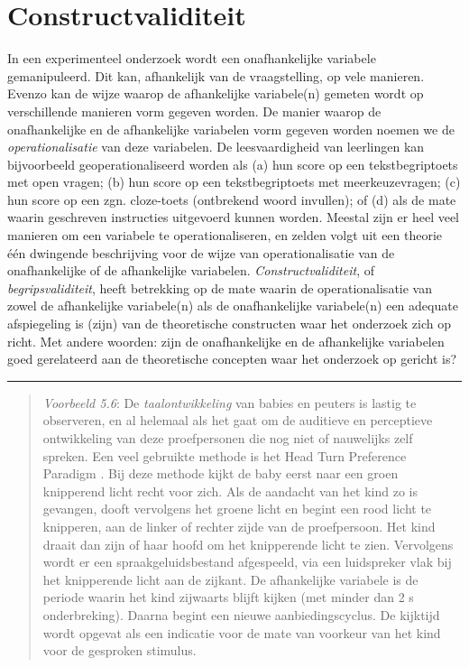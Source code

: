 \documentclass[
]{book}
\begin{document}
\section{Constructvaliditeit}\label{sec:constructvaliditeit}

In een experimenteel onderzoek wordt een onafhankelijke variabele
gemanipuleerd. Dit kan, afhankelijk van de vraagstelling, op vele
manieren. Evenzo kan de wijze waarop de afhankelijke variabele(n)
gemeten wordt op verschillende manieren vorm gegeven worden. De manier
waarop de onafhankelijke en de afhankelijke variabelen vorm gegeven
worden noemen we de \emph{operationalisatie} van deze variabelen. De
leesvaardigheid van leerlingen kan bijvoorbeeld geoperationaliseerd
worden als (a) hun score op een tekstbegriptoets met open vragen; (b)
hun score op een tekstbegriptoets met meerkeuzevragen; (c) hun score op
een zgn. cloze-toets (ontbrekend woord invullen); of (d) als de mate
waarin geschreven instructies uitgevoerd kunnen worden. Meestal zijn er
heel veel manieren om een variabele te operationaliseren, en zelden
volgt uit een theorie één dwingende beschrijving voor de wijze van
operationalisatie van de onafhankelijke of de afhankelijke variabelen.
\emph{Constructvaliditeit}, of \emph{begripsvaliditeit}, heeft betrekking op de
mate waarin de operationalisatie van zowel de afhankelijke variabele(n)
als de onafhankelijke variabele(n) een adequate afspiegeling is (zijn)
van de theoretische constructen waar het onderzoek zich op richt. Met
andere woorden: zijn de onafhankelijke en de afhankelijke variabelen
goed gerelateerd aan de theoretische concepten waar het onderzoek op
gericht is?

\begin{center}\rule{0.5\linewidth}{0.5pt}\end{center}

\begin{quote}
\emph{Voorbeeld 5.6}: De \emph{taalontwikkeling} van
babies en peuters is lastig te observeren, en al helemaal als het gaat
om de auditieve en perceptieve ontwikkeling van deze proefpersonen die
nog niet of nauwelijks zelf spreken. Een veel gebruikte methode is het
Head Turn Preference Paradigm \citep{John10}. Bij deze methode kijkt de baby
eerst naar een groen knipperend licht recht voor zich. Als de aandacht
van het kind zo is gevangen, dooft vervolgens het groene licht en begint
een rood licht te knipperen, aan de linker of rechter zijde van de
proefpersoon. Het kind draait dan zijn of haar hoofd om het knipperende
licht te zien. Vervolgens wordt er een spraakgeluidsbestand afgespeeld,
via een luidspreker vlak bij het knipperende licht aan de zijkant. De
afhankelijke variabele is de periode waarin het kind zijwaarts blijft
kijken (met minder dan 2 s onderbreking). Daarna begint een nieuwe
aanbiedingscyclus. De kijktijd wordt opgevat als een indicatie voor de
mate van voorkeur van het kind voor de gesproken stimulus.
\end{quote}
\end{document}
